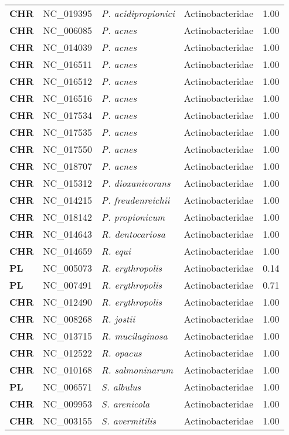 \begin{adjustwidth}{-3cm}{2cm}
{\begin{supertabular}{>{\bfseries}l|p{0.1\textwidth}p{0.14\textwidth}l|l}
CHR & NC\_019395 & \textit{P. acidipropionici} & Actinobacteridae & 1.00\\
CHR & NC\_006085 & \textit{P. acnes} & Actinobacteridae & 1.00\\
CHR & NC\_014039 & \textit{P. acnes} & Actinobacteridae & 1.00\\
CHR & NC\_016511 & \textit{P. acnes} & Actinobacteridae & 1.00\\
CHR & NC\_016512 & \textit{P. acnes} & Actinobacteridae & 1.00\\
CHR & NC\_016516 & \textit{P. acnes} & Actinobacteridae & 1.00\\
CHR & NC\_017534 & \textit{P. acnes} & Actinobacteridae & 1.00\\
CHR & NC\_017535 & \textit{P. acnes} & Actinobacteridae & 1.00\\
CHR & NC\_017550 & \textit{P. acnes} & Actinobacteridae & 1.00\\
CHR & NC\_018707 & \textit{P. acnes} & Actinobacteridae & 1.00\\
CHR & NC\_015312 & \textit{P. dioxanivorans} & Actinobacteridae & 1.00\\
CHR & NC\_014215 & \textit{P. freudenreichii} & Actinobacteridae & 1.00\\
CHR & NC\_018142 & \textit{P. propionicum} & Actinobacteridae & 1.00\\
CHR & NC\_014643 & \textit{R. dentocariosa} & Actinobacteridae & 1.00\\
CHR & NC\_014659 & \textit{R. equi} & Actinobacteridae & 1.00\\
PL & NC\_005073 & \textit{R. erythropolis} & Actinobacteridae & 0.14\\
PL & NC\_007491 & \textit{R. erythropolis} & Actinobacteridae & 0.71\\
CHR & NC\_012490 & \textit{R. erythropolis} & Actinobacteridae & 1.00\\
CHR & NC\_008268 & \textit{R. jostii} & Actinobacteridae & 1.00\\
CHR & NC\_013715 & \textit{R. mucilaginosa} & Actinobacteridae & 1.00\\
CHR & NC\_012522 & \textit{R. opacus} & Actinobacteridae & 1.00\\
CHR & NC\_010168 & \textit{R. salmoninarum} & Actinobacteridae & 1.00\\
PL & NC\_006571 & \textit{S. albulus} & Actinobacteridae & 1.00\\
CHR & NC\_009953 & \textit{S. arenicola} & Actinobacteridae & 1.00\\
CHR & NC\_003155 & \textit{S. avermitilis} & Actinobacteridae & 1.00\\

\end{supertabular}}
\end{adjustwidth}
